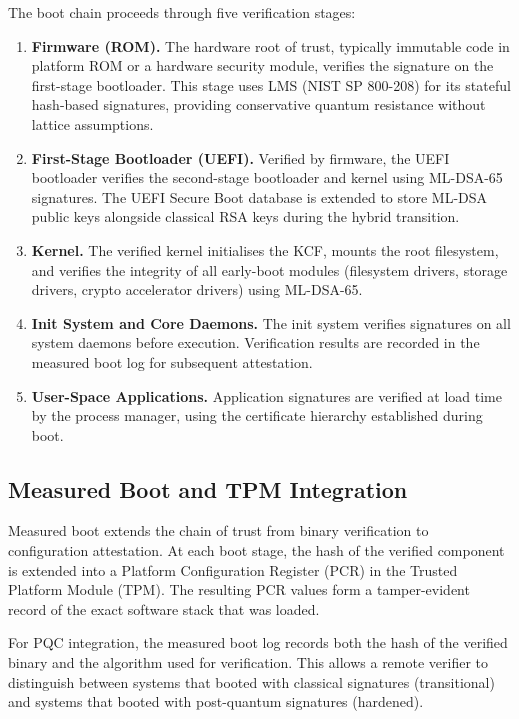 \documentclass[11pt, a4paper]{article}
\begin{document}
The boot chain proceeds through five verification stages:

\begin{enumerate}
    \item \textbf{Firmware (ROM).} The hardware root of trust, typically immutable code in platform ROM or a hardware security module, verifies the signature on the first-stage bootloader. This stage uses LMS (NIST SP 800-208) for its stateful hash-based signatures, providing conservative quantum resistance without lattice assumptions.
    \item \textbf{First-Stage Bootloader (UEFI).} Verified by firmware, the UEFI bootloader verifies the second-stage bootloader and kernel using ML-DSA-65 signatures. The UEFI Secure Boot database is extended to store ML-DSA public keys alongside classical RSA keys during the hybrid transition.
    \item \textbf{Kernel.} The verified kernel initialises the KCF, mounts the root filesystem, and verifies the integrity of all early-boot modules (filesystem drivers, storage drivers, crypto accelerator drivers) using ML-DSA-65.
    \item \textbf{Init System and Core Daemons.} The init system verifies signatures on all system daemons before execution. Verification results are recorded in the measured boot log for subsequent attestation.
    \item \textbf{User-Space Applications.} Application signatures are verified at load time by the process manager, using the certificate hierarchy established during boot.
\end{enumerate}

\subsection{Measured Boot and TPM Integration}\label{sec:measured-boot}

Measured boot extends the chain of trust from binary verification to configuration attestation. At each boot stage, the hash of the verified component is extended into a Platform Configuration Register (PCR) in the Trusted Platform Module (TPM). The resulting PCR values form a tamper-evident record of the exact software stack that was loaded.

For PQC integration, the measured boot log records both the hash of the verified binary and the algorithm used for verification. This allows a remote verifier to distinguish between systems that booted with classical signatures (transitional) and systems that booted with post-quantum signatures (hardened).
\end{document}
